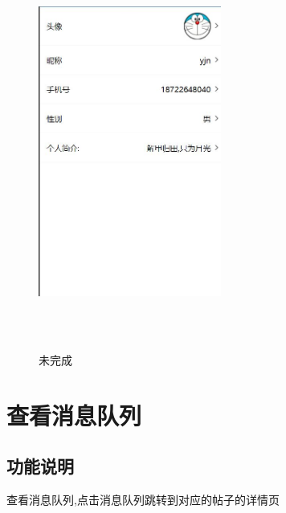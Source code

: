 \begin{figure}[htbp]
\begin{minipage}[t]{0.48\textwidth}
    \includegraphics[width=6cm,height=13cm]{design/image/bianji.png}
    \caption{未完成}
    \end{minipage}
    \end{figure}

\newpage

\section{查看消息队列}

\subsection{功能说明}
查看消息队列,点击消息队列跳转到对应的帖子的详情页
